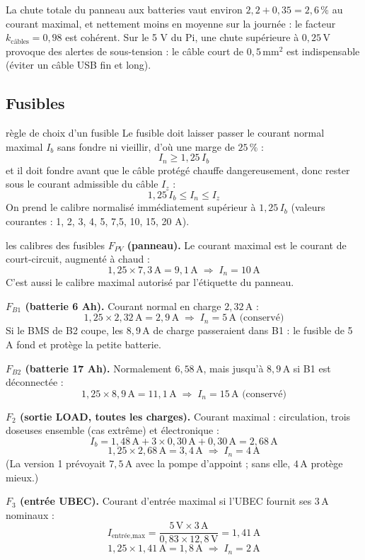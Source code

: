 \documentclass[11pt,a4paper]{article}
\newcommand{\U}[1]{\,\mathrm{#1}}
\begin{document}
La chute totale du panneau aux batteries vaut environ $2{,}2 + 0{,}35 = 2{,}6\U{\%}$ au courant maximal, et nettement moins en moyenne sur la journée : le facteur $k_{\text{câbles}} = 0{,}98$ est cohérent. Sur le 5 V du Pi, une chute supérieure à $0{,}25\U{V}$ provoque des alertes de sous-tension : le câble court de $0{,}5\U{mm^2}$ est indispensable (éviter un câble USB fin et long).

\subsection{Fusibles}

\begin{demo}{règle de choix d'un fusible}
Le fusible doit laisser passer le courant normal maximal $I_b$ sans fondre ni vieillir, d'où une marge de $25\U{\%}$ :
\[
I_n \ge 1{,}25 \, I_b
\]
et il doit fondre avant que le câble protégé chauffe dangereusement, donc rester sous le courant admissible du câble $I_z$ :
\[
1{,}25 \, I_b \le I_n \le I_z
\]
On prend le calibre normalisé immédiatement supérieur à $1{,}25\,I_b$ (valeurs courantes : 1, 2, 3, 4, 5, 7,5, 10, 15, 20 A).
\end{demo}

\begin{calcul}{les calibres des fusibles}
\textbf{$F_{PV}$ (panneau).} Le courant maximal est le courant de court-circuit, augmenté à chaud :
\[
1{,}25 \times 7{,}3\U{A} = 9{,}1\U{A} \;\Rightarrow\; I_n = 10\U{A}
\]
C'est aussi le calibre maximal autorisé par l'étiquette du panneau.

\textbf{$F_{B1}$ (batterie 6 Ah).} Courant normal en charge $2{,}32\U{A}$ :
\[
1{,}25 \times 2{,}32\U{A} = 2{,}9\U{A} \;\Rightarrow\; I_n = 5\U{A} \text{ (conservé)}
\]
Si le BMS de B2 coupe, les $8{,}9\U{A}$ de charge passeraient dans B1 : le fusible de 5 A fond et protège la petite batterie.

\textbf{$F_{B2}$ (batterie 17 Ah).} Normalement $6{,}58\U{A}$, mais jusqu'à $8{,}9\U{A}$ si B1 est déconnectée :
\[
1{,}25 \times 8{,}9\U{A} = 11{,}1\U{A} \;\Rightarrow\; I_n = 15\U{A} \text{ (conservé)}
\]

\textbf{$F_2$ (sortie LOAD, toutes les charges).} Courant maximal : circulation, trois doseuses ensemble (cas extrême) et électronique :
\[
I_b = 1{,}48\U{A} + 3 \times 0{,}30\U{A} + 0{,}30\U{A} = 2{,}68\U{A}
\]
\[
1{,}25 \times 2{,}68\U{A} = 3{,}4\U{A} \;\Rightarrow\; I_n = 4\U{A}
\]
(La version 1 prévoyait $7{,}5\U{A}$ avec la pompe d'appoint ; sans elle, $4\U{A}$ protège mieux.)

\textbf{$F_3$ (entrée UBEC).} Courant d'entrée maximal si l'UBEC fournit ses $3\U{A}$ nominaux :
\[
I_{\text{entrée,max}} = \frac{5\U{V} \times 3\U{A}}{0{,}83 \times 12{,}8\U{V}} = 1{,}41\U{A}
\]
\[
1{,}25 \times 1{,}41\U{A} = 1{,}8\U{A} \;\Rightarrow\; I_n = 2\U{A}
\]
\end{calcul}
\end{document}
